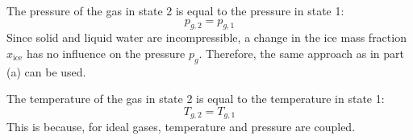 The pressure of the gas in state 2 is equal to the pressure in state 1:  
\[
p_{g,2} = p_{g,1}
\]  
Since solid and liquid water are incompressible, a change in the ice mass fraction \( x_{\text{ice}} \) has no influence on the pressure \( p_g \). Therefore, the same approach as in part (a) can be used.  

The temperature of the gas in state 2 is equal to the temperature in state 1:  
\[
T_{g,2} = T_{g,1}
\]  
This is because, for ideal gases, temperature and pressure are coupled.